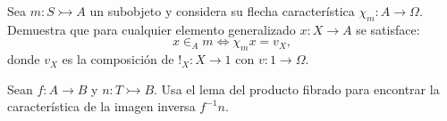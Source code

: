\begin{exercise}[teca=1]
  Sea \(m\colon S\rightarrowtail A\) un subobjeto y considera su flecha
  característica \(\chi_m\colon A\to \Omega\). Demuestra que para
  cualquier elemento generalizado \(x\colon X\to A\) se satisface:
  \begin{equation*}
      x\in_A m \iff \chi_m x = v_X,
  \end{equation*}
  donde \(v_X\) es la composición de \(!_X\colon X\to 1\) con 
  \(v\colon 1\to \Omega\).
\end{exercise}

\begin{exercise}
  Sean \(f\colon A\to B\) y \(n\colon T\rightarrowtail B\). Usa el lema
  del producto fibrado para encontrar la característica de la imagen
  inversa \(f^{-1}n\).
\end{exercise}